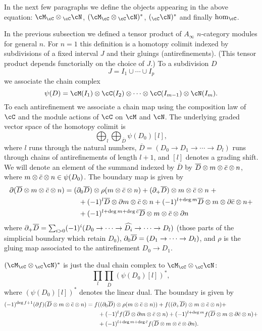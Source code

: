 In the next few paragraphs we define the objects appearing in the above equation:
$\cM_\cC\ot {_\cC\cN}$, $(\cM_\cC\ot {_\cC\cN})^*$, $(_\cC\cN)^*$ and finally
$\hom_\cC$.


\def\olD{{\overline D}}
\def\cbar{{\bar c}}
In the previous subsection we defined a tensor product of $A_\infty$ $n$-category modules
for general $n$.
For $n=1$ this definition is a homotopy colimit indexed by subdivisions of a fixed interval $J$
and their gluings (antirefinements).
(This tensor product depends functorially on the choice of $J$.)
To a subdivision $D$
\[
	J = I_1\cup \cdots\cup I_p
\]
we associate the chain complex
\[
	\psi(D) = \cM(I_1)\ot\cC(I_2)\ot\cdots\ot\cC(I_{m-1})\ot\cN(I_m) .
\]
To each antirefinement we associate a chain map using the composition law of $\cC$ and the 
module actions of $\cC$ on $\cM$ and $\cN$.
The underlying graded vector space of the homotopy colimit is
\[
	\bigoplus_l \bigoplus_{\olD} \psi(D_0)[l] ,
\]
where $l$ runs through the natural numbers, $\olD = (D_0\to D_1\to\cdots\to D_l)$
runs through chains of antirefinements of length $l+1$, and $[l]$ denotes a grading shift.
We will denote an element of the summand indexed by $\olD$ by
$\olD\ot m\ot\cbar\ot n$, where $m\ot\cbar\ot n \in \psi(D_0)$.
The boundary map is given by
\begin{align*}
	\bd(\olD\ot m\ot\cbar\ot n) &= (\bd_0 \olD)\ot \rho(m\ot\cbar\ot n) + (\bd_+ \olD)\ot m\ot\cbar\ot n \; + \\
	& \qquad + (-1)^l \olD\ot\bd m\ot\cbar\ot n + (-1)^{l+\deg m}  \olD\ot m\ot\bd \cbar\ot n + \\
	& \qquad + (-1)^{l+\deg m + \deg \cbar}  \olD\ot m\ot \cbar\ot \bd n
\end{align*}
where $\bd_+ \olD = \sum_{i>0} (-1)^i (D_0\to \cdots \to \widehat{D_i} \to \cdots \to D_l)$ (those parts of the simplicial
boundary which retain $D_0$), $\bd_0 \olD = (D_1 \to \cdots \to D_l)$,
and $\rho$ is the gluing map associated to the antirefinement $D_0\to D_1$.

$(\cM_\cC\ot {_\cC\cN})^*$ is just the dual chain complex to $\cM_\cC\ot {_\cC\cN}$:
\[
	\prod_l \prod_{\olD} (\psi(D_0)[l])^* ,
\]
where $(\psi(D_0)[l])^*$ denotes the linear dual.
The boundary is given by
\begin{align}
\label{eq:tensor-product-boundary}
	 (-1)^{\deg f +1} (\bd f)(\olD\ot m\ot\cbar\ot n) & = f((\bd_0 \olD)\ot \rho(m\ot\cbar\ot n)) +  f((\bd_+ \olD)\ot m\ot\cbar\ot n) + \\
						     & \qquad + (-1)^{l} f(\olD\ot\bd m\ot\cbar \ot n)  + (-1)^{l + \deg m} f(\olD\ot m\ot\bd \cbar \ot n)  + \notag \\
			& \qquad	 + (-1)^{l + \deg m + \deg \cbar} f(\olD\ot m\ot\cbar\ot \bd n). \notag
\end{align}

